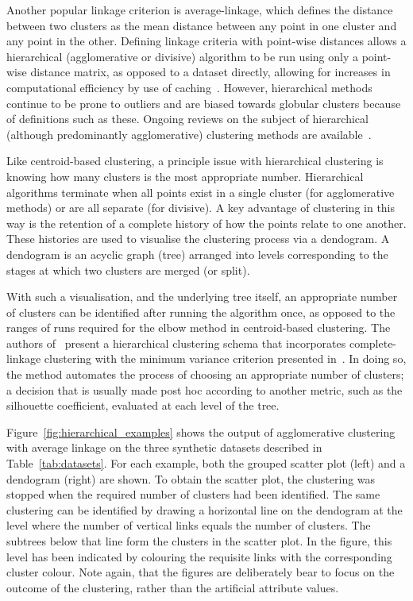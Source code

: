 Another popular linkage criterion is average-linkage, which defines the distance
between two clusters as the mean distance between any point in one cluster and
any point in the other. Defining linkage criteria with point-wise distances
allows a hierarchical (agglomerative or divisive) algorithm to be run using only
a point-wise distance matrix, as opposed to a dataset directly, allowing for
increases in computational efficiency by use of caching~\cite{Nielsen2016}.
However, hierarchical methods continue to be prone to outliers and are biased
towards globular clusters because of definitions such as these. Ongoing reviews
on the subject of hierarchical (although predominantly agglomerative) clustering
methods are available~\cite{Murtagh1983,Murtagh2012,Murtagh2017}.

Like centroid-based clustering, a principle issue with hierarchical clustering
is knowing how many clusters is the most appropriate number. Hierarchical
algorithms terminate when all points exist in a single cluster (for
agglomerative methods) or are all separate (for divisive). A key advantage of
clustering in this way is the retention of a complete history of how the points
relate to one another. These histories are used to visualise the clustering
process via a dendogram. A dendogram is an acyclic graph (tree) arranged into
levels corresponding to the stages at which two clusters are merged (or split).

With such a visualisation, and the underlying tree itself, an appropriate number
of clusters can be identified after running the algorithm once, as opposed to
the ranges of runs required for the elbow method in centroid-based clustering.
The authors of~\cite{Tellaroli2016} present a hierarchical clustering schema
that incorporates complete-linkage clustering with the minimum variance
criterion presented in~\cite{Ward1963}. In doing so, the method automates the
process of choosing an appropriate number of clusters; a decision that is
usually made post hoc according to another metric, such as the silhouette
coefficient, evaluated at each level of the tree.

Figure~\ref{fig:hierarchical_examples} shows the output of agglomerative
clustering with average linkage on the three synthetic datasets described in
Table~\ref{tab:datasets}. For each example, both the grouped scatter plot (left)
and a dendogram (right) are shown. To obtain the scatter plot, the clustering
was stopped when the required number of clusters had been identified. The same
clustering can be identified by drawing a horizontal line on the dendogram at
the level where the number of vertical links equals the number of clusters. The
subtrees below that line form the clusters in the scatter plot. In the figure,
this level has been indicated by colouring the requisite links with the
corresponding cluster colour. Note again, that the figures are deliberately bear
to focus on the outcome of the clustering, rather than the artificial attribute
values.

